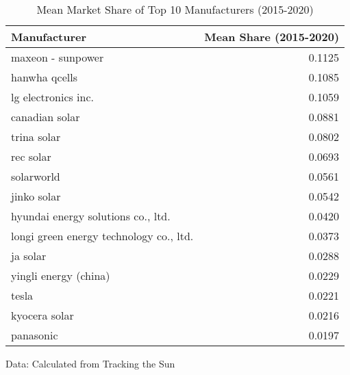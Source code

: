 \begin{table}[!t]
\caption*{
{\large Mean Market Share of Top 10 Manufacturers (2015-2020)}
} 
\fontsize{12.0pt}{14.4pt}\selectfont
\begin{tabular*}{\linewidth}{@{\extracolsep{\fill}}lr}
\toprule
Manufacturer & Mean Share (2015-2020) \\ 
\midrule\addlinespace[2.5pt]
maxeon - sunpower & 0.1125 \\ 
hanwha qcells & 0.1085 \\ 
lg electronics inc. & 0.1059 \\ 
canadian solar & 0.0881 \\ 
trina solar & 0.0802 \\ 
rec solar & 0.0693 \\ 
solarworld & 0.0561 \\ 
jinko solar & 0.0542 \\ 
hyundai energy solutions co., ltd. & 0.0420 \\ 
longi green energy technology co., ltd. & 0.0373 \\ 
ja solar & 0.0288 \\ 
yingli energy (china) & 0.0229 \\ 
tesla & 0.0221 \\ 
kyocera solar & 0.0216 \\ 
panasonic & 0.0197 \\ 
\bottomrule
\end{tabular*}
\begin{minipage}{\linewidth}
Data: Calculated from Tracking the Sun\\
\end{minipage}
\end{table}
